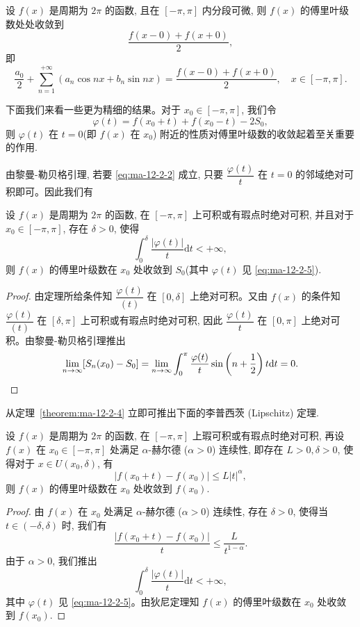 \begin{theorem}\label{theorem:ma-12-2-3}
设 $f(x)$ 是周期为 $2\pi$ 的函数, 且在 $[-\pi,\pi]$ 内分段可微, 则 $f(x)$ 的傅里叶级数处处收敛到
\[
  \frac{f(x-0)+f(x+0)}{2},
\]
即
\[
  \frac{a_0}{2}+\sum_{n=1}^{+\infty}(a_n\cos nx+b_n\sin nx)
  =
  \frac{f(x-0)+f(x+0)}{2},
  \quad x\in[-\pi,\pi].
\]
\end{theorem}

下面我们来看一些更为精细的结果。对于 $x_0\in[-\pi,\pi]$, 我们令
\begin{equation}
  \varphi(t)=f(x_0+t)+f(x_0-t)-2S_0,
  \label{eq:ma-12-2-5}
\end{equation}
则 $\varphi(t)$ 在 $t=0$(即 $f(x)$ 在 $x_0$) 附近的性质对傅里叶级数的收敛起着至关重要的作用.

由黎曼-勒贝格引理, 若要 \eqref{eq:ma-12-2-2} 成立, 只要 $\dfrac{\varphi(t)}{t}$ 在 $t=0$ 的邻域绝对可积即可。因此我们有

\begin{theorem}[{狄尼定理}]\label{theorem:ma-12-2-4}
设 $f(x)$ 是周期为 $2\pi$ 的函数, 在 $[-\pi,\pi]$ 上可积或有瑕点时绝对可积, 并且对于 $x_0\in[-\pi,\pi]$, 存在 $\delta>0$, 使得
\[
  \int_0^\delta\frac{|\varphi(t)|}{t}\mathrm dt<+\infty,
\]
则 $f(x)$ 的傅里叶级数在 $x_0$ 处收敛到 $S_0$(其中 $\varphi(t)$ 见 \eqref{eq:ma-12-2-5}).
\end{theorem}


\begin{proof}
由定理所给条件知 $\dfrac{\varphi(t)}{(t)}$ 在 $[0,\delta]$ 上绝对可积。又由 $f(x)$ 的条件知 $\dfrac{\varphi(t)}{(t)}$ 在 $[\delta,\pi]$ 上可积或有瑕点时绝对可积, 因此 $\dfrac{\varphi(t)}{t}$ 在 $[0,\pi]$ 上绝对可积。由黎曼-勒贝格引理推出
\[
  \lim_{n\to\infty}[S_n(x_0)-S_0]
  =\lim_{n\to\infty}\int_0^\pi
  \frac{\varphi(t)}{t}\sin\left(n+\frac12\right)t\mathrm dt=0.
\qedhere
\]
\end{proof}


从定理~\ref{theorem:ma-12-2-4} 立即可推出下面的李普西茨 (Lipschitz) 定理.

\begin{theorem}[{李普西茨定理}]\label{theorem:ma-12-2-5}
设 $f(x)$ 是周期为 $2\pi$ 的函数, 在 $[-\pi,\pi]$ 上瑕可积或有瑕点时绝对可积, 再设 $f(x)$ 在 $x_0\in[-\pi,\pi]$ 处满足 $\alpha$-赫尔德 ($\alpha>0$) 连续性, 即存在 $L>0,\delta>0$, 使得对于 $x\in U(x_0,\delta)$, 有
\[
  |f(x_0+t)-f(x_0)|\leqslant L|t|^\alpha,
\]
则 $f(x)$ 的傅里叶级数在 $x_0$ 处收敛到 $f(x_0)$.
\end{theorem}


\begin{proof}
由 $f(x)$ 在 $x_0$ 处满足 $\alpha$-赫尔德 ($\alpha>0$) 连续性, 存在 $\delta>0$, 使得当 $t\in(-\delta,\delta)$ 时, 我们有
\[
  \frac{|f(x_0+t)-f(x_0)|}{t}\leqslant\frac{L}{t^{1-\alpha}}.
\]
由于 $\alpha>0$, 我们推出
\[
  \int_0^\delta\frac{|\varphi(t)|}{t}\mathrm dt<+\infty,
\]
其中 $\varphi(t)$ 见 \eqref{eq:ma-12-2-5}。由狄尼定理知 $f(x)$ 的傅里叶级数在 $x_0$ 处收敛到 $f(x_0)$.
\end{proof}


